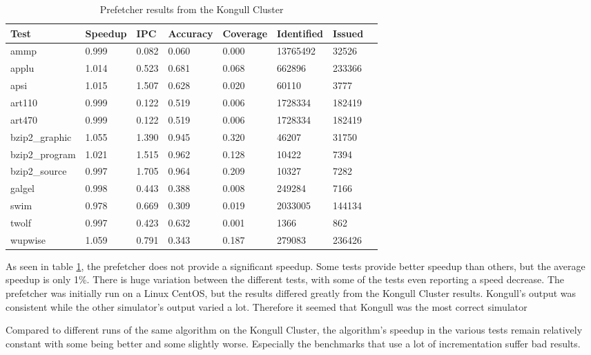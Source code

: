 

\begin{table}[!t]
\renewcommand{\arraystretch}{1.3}
\caption{Prefetcher results from the Kongull Cluster}
\label{table:results}
\centering
\begin{tabular}{|l|l|l|l|l|l|l|l|}
\hline
\bfseries Test & \bfseries Speedup & \bfseries IPC & \bfseries Accuracy & \bfseries Coverage & \bfseries Identified & \bfseries Issued\\
\hline
\hline
ammp 		& 0.999 & 0.082 & 0.060 & 0.000 & 13765492 & 32526\\
applu 		& 1.014 & 0.523 & 0.681 & 0.068 & 662896   & 233366\\
apsi 		& 1.015 & 1.507 & 0.628 & 0.020 & 60110    & 3777\\	
art110 		& 0.999 & 0.122 & 0.519 & 0.006 & 1728334  & 182419\\	
art470 		& 0.999 & 0.122 & 0.519 & 0.006 & 1728334  & 182419\\
bzip2\_graphic 	& 1.055 & 1.390 & 0.945 & 0.320 & 46207    & 31750\\
bzip2\_program 	& 1.021 & 1.515 & 0.962 & 0.128 & 10422    & 7394\\
bzip2\_source 	& 0.997 & 1.705 & 0.964 & 0.209 & 10327    & 7282\\
galgel 		& 0.998 & 0.443 & 0.388 & 0.008 & 249284   & 7166\\
swim 		& 0.978 & 0.669 & 0.309 & 0.019 & 2033005  & 144134\\
twolf 		& 0.997 & 0.423 & 0.632 & 0.001 & 1366 	   & 862	\\
wupwise 	& 1.059 & 0.791 & 0.343 & 0.187 & 279083   & 236426\\
\hline
\end{tabular}
\end{table}

As seen in table \ref{table:results}, the prefetcher does not provide a significant speedup. Some tests provide better speedup than others, but the average speedup is only 1\%. There is huge variation between the different tests, with some of the tests even reporting a speed decrease. The prefetcher was initially run on a Linux CentOS, but the results differed greatly from the Kongull Cluster results. Kongull's output was consistent while the other simulator's output varied a lot. Therefore it seemed that Kongull was the most correct simulator

Compared to different runs of the same algorithm on the Kongull Cluster, the algorithm's speedup in the various tests remain relatively constant with some being better and some slightly worse. Especially the benchmarks that use a lot of incrementation suffer bad results. 

